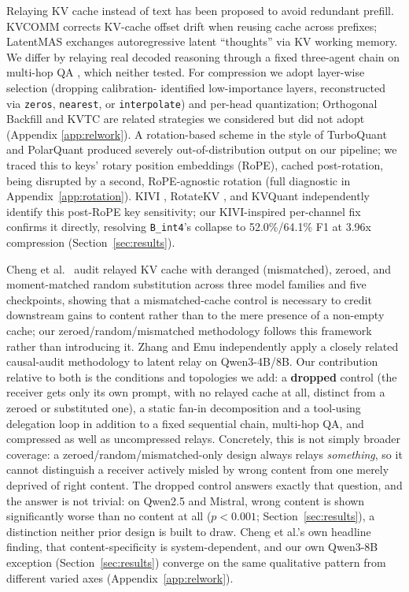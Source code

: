 \documentclass[11pt]{article}
\begin{document}
Relaying KV cache instead of text has been proposed to avoid redundant
prefill. KVCOMM \citep{kvcomm2025} corrects KV-cache offset drift when
reusing cache across prefixes; LatentMAS \citep{latentmas2026} exchanges
autoregressive latent ``thoughts'' via KV working memory. We differ by
relaying real decoded reasoning through a fixed three-agent chain on
multi-hop QA \citep{hotpotqa2018}, which neither tested. For
compression we adopt layer-wise selection (dropping calibration-
identified low-importance layers, reconstructed via \texttt{zeros},
\texttt{nearest}, or \texttt{interpolate}) and per-head quantization;
Orthogonal Backfill \citep{orthobackfill2026} and KVTC \citep{kvtc2026}
are related strategies we considered but did not adopt (Appendix
\ref{app:relwork}). A rotation-based scheme in the style of TurboQuant
\citep{turboquant2026} and PolarQuant \citep{polarquant2026} produced
severely out-of-distribution output on our pipeline; we traced this to
keys' rotary position embeddings (RoPE), cached post-rotation, being
disrupted by a second, RoPE-agnostic rotation (full diagnostic in
Appendix~\ref{app:rotation}). KIVI \citep{kivi2024}, RotateKV
\citep{rotatekv2025}, and KVQuant \citep{kvquant2024} independently
identify this post-RoPE key sensitivity; our KIVI-inspired per-channel
fix confirms it directly, resolving \texttt{B\_int4}'s collapse to
52.0\%/64.1\% F1 at 3.96x compression (Section~\ref{sec:results}).

Cheng et al.\ \citep{latentcommpay2026} audit relayed KV cache with
deranged (mismatched), zeroed, and moment-matched random substitution
across three model families and five checkpoints, showing that a
mismatched-cache control is necessary to credit downstream gains to
content rather than to the mere presence of a non-empty cache; our
zeroed/random/mismatched methodology follows this framework rather than
introducing it. Zhang and Emu \citep{zhangemu2026} independently apply a
closely related causal-audit methodology to latent relay on
Qwen3-4B/8B. Our contribution relative to both is the conditions and
topologies we add: a \textbf{dropped} control (the receiver gets only
its own prompt, with no relayed cache at all, distinct from a zeroed or
substituted one), a static fan-in decomposition and a tool-using
delegation loop in addition to a fixed sequential chain, multi-hop QA,
and compressed as well as uncompressed relays. Concretely, this is not
simply broader coverage: a zeroed/random/mismatched-only design always
relays \emph{something}, so it cannot distinguish a receiver actively
misled by wrong content from one merely deprived of right content. The
dropped control answers exactly that question, and the answer is not
trivial: on Qwen2.5 and Mistral, wrong content is shown significantly
worse than no content at all ($p<0.001$; Section~\ref{sec:results}), a
distinction neither prior design is built to draw. Cheng et al.'s own
headline finding, that content-specificity is system-dependent, and our
own Qwen3-8B exception (Section~\ref{sec:results}) converge on the same
qualitative pattern from different varied axes
(Appendix~\ref{app:relwork}).
\end{document}
